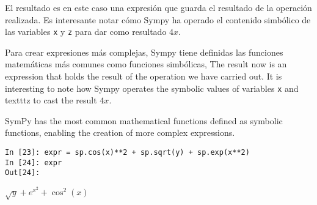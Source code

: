 \begin{paracol}{2}
El resultado es en este caso una expresión que guarda el resultado de la operación realizada. Es interesante notar cómo Sympy ha operado el contenido simbólico de las variables \texttt{x} y \texttt{z} para dar como resultado $4x$.

Para crear expresiones más complejas, Sympy tiene definidas las funciones matemáticas más comunes como funciones simbólicas,
\switchcolumn
The result now is an expression that holds the result of the operation we have carried out. It is interesting to note how Sympy operates the symbolic values of variables \texttt{x} and texttt{z} to cast the result $4x$. 

SymPy has the most common mathematical functions defined as symbolic functions, enabling the creation of more complex expressions.
\end{paracol}

\begin{center}
\begin{minipage}{.8\textwidth}
	\begin{verbatim}
In [23]: expr = sp.cos(x)**2 + sp.sqrt(y) + sp.exp(x**2)
In [24]: expr
Out[24]: 			
	\end{verbatim}
	$\sqrt{y}+e^{x^2}+\cos^2(x)$
\end{minipage}
\end{center}

